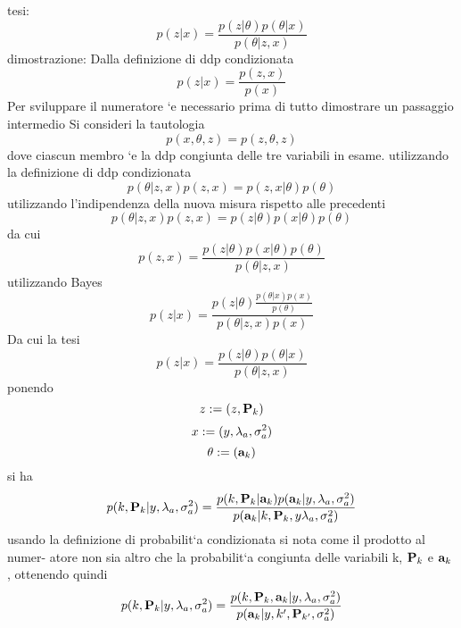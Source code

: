 tesi:
\begin{equation}
p(z|x)=\frac{p(z|\theta)p(\theta|x)}{p(\theta|z,x)}
\end{equation}
dimostrazione: Dalla definizione di ddp condizionata
\begin{equation}
p(z|x)=\frac{p(z,x)}{p(x)}
\end{equation}
Per sviluppare il numeratore `e necessario prima di tutto dimostrare un passaggio
intermedio Si consideri la tautologia
\begin{equation}
p(x,\theta,z)=p(z,\theta,z)
\end{equation}
dove ciascun membro `e la ddp congiunta delle tre variabili in esame. utilizzando la
definizione di ddp condizionata
\begin{equation}
p(\theta|z, x)p(z, x) = p(z, x|\theta)p(\theta)
\end{equation}
utilizzando l’indipendenza della nuova misura rispetto alle precedenti
\begin{equation}
p(\theta|z, x)p(z, x) = p(z|\theta)p(x|\theta)p(\theta)
\end{equation}
da cui
\begin{equation}
p(z,x)=\frac{p(z|\theta)p(x|\theta)p(\theta)
}{p(\theta|z,x)}
\end{equation}
utilizzando Bayes
\begin{equation}
p(z|x)=\frac{p(z|\theta)\frac{p(\theta|x)p(x)}{p(\theta)}}{p(\theta|z,x)p(x)}
\end{equation}
Da cui la tesi
\begin{equation}
p(z|x)=\frac{p(z|\theta)p(\theta|x)}{p(\theta|z,x)}
\end{equation}
ponendo
\begin{equation}
z:=(z,\textbf{P}_k)
\end{equation}
\begin{equation}
x:=(y,\lambda_a,\sigma_a^2)
\end{equation}
\begin{equation}
\theta:=(\textbf{a}_k)
\end{equation}
si ha
\begin{equation}
p(k,\textbf{P}_k|y,\lambda_a,\sigma_a^2)=\frac{p(k,\textbf{P}_k|\textbf{a}_k)p(\textbf{a}_k|y,\lambda_a,\sigma_a^2)}{p(\textbf{a}_k|k,\textbf{P}_k,y\lambda_a,\sigma_a^2)}
\end{equation}
usando la definizione di probabilit`a condizionata si nota come il prodotto al numer-
atore non sia altro che la probabilit`a congiunta delle variabili k, $\textbf{P}_k$ e $\textbf{a}_k$ , ottenendo
quindi
\begin{equation}
p(k,\textbf{P}_k|y,\lambda_a,\sigma_a^2)=\frac{p(k,\textbf{P}_k,\textbf{a}_k|y,\lambda_a,\sigma_a^2)}{p(\textbf{a}_k|y,k',\textbf{P}_{k'},\sigma_a^2)}
\end{equation}
